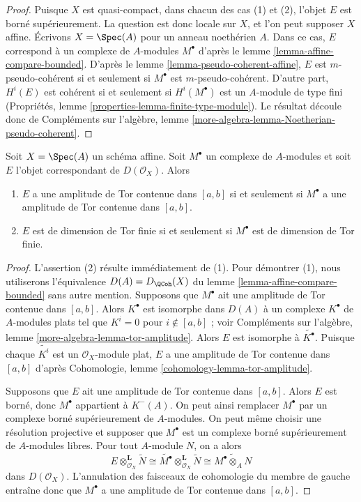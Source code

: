 \begin{proof}
Puisque $X$ est quasi-compact, dans chacun des cas (1) et (2), l'objet $E$
est borné supérieurement. La question est donc locale sur $X$, et l'on peut supposer
$X$ affine. Écrivons $X = \Spec(A)$ pour un anneau noethérien $A$.
Dans ce cas, $E$ correspond à un complexe de $A$-modules $M^\bullet$
d'après le lemme \ref{lemma-affine-compare-bounded}. D'après
le lemme \ref{lemma-pseudo-coherent-affine},
$E$ est $m$-pseudo-cohérent si et seulement si $M^\bullet$
est $m$-pseudo-cohérent. D'autre part, $H^i(E)$ est cohérent
si et seulement si $H^i(M^\bullet)$ est un $A$-module de type fini
(Propriétés, lemme \ref{properties-lemma-finite-type-module}).
Le résultat découle donc de Compléments sur l'algèbre, lemme
\ref{more-algebra-lemma-Noetherian-pseudo-coherent}.
\end{proof}

\begin{lemma}
\label{lemma-tor-dimension-affine}
Soit $X = \Spec(A)$ un schéma affine. Soit $M^\bullet$ un
complexe de $A$-modules et soit $E$ l'objet correspondant
de $D(\mathcal{O}_X)$. Alors
\begin{enumerate}
\item $E$ a une amplitude de Tor contenue dans $[a, b]$ si et seulement si $M^\bullet$
a une amplitude de Tor contenue dans $[a, b]$.
\item $E$ est de dimension de Tor finie si et seulement si $M^\bullet$
est de dimension de Tor finie.
\end{enumerate}
\end{lemma}

\begin{proof}
L'assertion (2) résulte immédiatement de (1). Pour démontrer (1), nous
utiliserons l'équivalence $D(A) = D_\QCoh(X)$ du
lemme \ref{lemma-affine-compare-bounded}
sans autre mention.
Supposons que $M^\bullet$ ait une amplitude de Tor contenue dans $[a, b]$. Alors $K^\bullet$
est isomorphe dans $D(A)$ à un complexe $K^\bullet$ de $A$-modules plats
tel que $K^i = 0$ pour $i \not \in [a, b]$ ; voir
Compléments sur l'algèbre, lemme \ref{more-algebra-lemma-tor-amplitude}.
Alors $E$ est isomorphe à $\widetilde{K^\bullet}$. Puisque chaque
$\widetilde{K^i}$ est un $\mathcal{O}_X$-module plat,
$E$ a une amplitude de Tor contenue dans $[a, b]$ d'après
Cohomologie, lemme \ref{cohomology-lemma-tor-amplitude}.

\medskip\noindent
Supposons que $E$ ait une amplitude de Tor contenue dans $[a, b]$. Alors $E$ est borné,
donc $M^\bullet$ appartient à $K^-(A)$. On peut ainsi remplacer $M^\bullet$
par un complexe borné supérieurement de $A$-modules. On peut même choisir
une résolution projective et supposer que $M^\bullet$ est un complexe borné supérieurement
de $A$-modules libres. Pour tout $A$-module $N$, on a alors
$$
E \otimes_{\mathcal{O}_X}^\mathbf{L} \widetilde{N}
\cong
\widetilde{M^\bullet} \otimes_{\mathcal{O}_X}^\mathbf{L} \widetilde{N}
\cong
\widetilde{M^\bullet \otimes_A N}
$$
dans $D(\mathcal{O}_X)$. L'annulation des faisceaux de cohomologie du
membre de gauche entraîne donc que $M^\bullet$ a une amplitude de Tor contenue dans $[a, b]$.
\end{proof}

